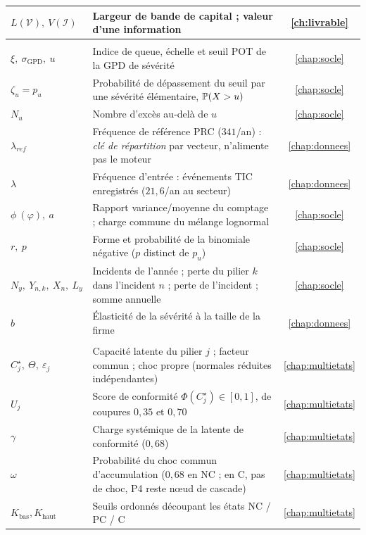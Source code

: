 {\begin{longtable}{>{\raggedright}p{3.3cm} >{\raggedright\arraybackslash}p{10.2cm} c}
$L(\mathcal{V}),\ V(\mathcal{I})$ & Largeur de bande de capital ; valeur d'une information & \ref{ch:livrable} \\
\midrule
\multicolumn{3}{@{}l}{\emph{\textcolor{navy}{Socle : fréquence et sévérité}}} \\
$\xi,\ \sigma_{\text{GPD}},\ u$ & Indice de queue, échelle et seuil POT de la GPD de sévérité & \ref{chap:socle} \\
$\zeta_u=p_u$ & Probabilité de dépassement du seuil par une sévérité élémentaire, $\mathbb{P}(X>u)$ & \ref{chap:socle} \\
$N_u$ & Nombre d'excès au-delà de $u$ & \ref{chap:socle} \\
$\lambda_{ref}$ & Fréquence de référence PRC ($341$/an) : \emph{clé de répartition} par vecteur, n'alimente pas le moteur & \ref{chap:donnees} \\
$\lambda$ & Fréquence d'entrée : événements TIC enregistrés ($21{,}6$/an au secteur) & \ref{chap:donnees} \\
$\phi\ (\varphi),\ a$ & Rapport variance/moyenne du comptage ; charge commune du mélange lognormal & \ref{chap:socle} \\
$r,\ p$ & Forme et probabilité de la binomiale négative ($p$ distinct de $p_u$) & \ref{chap:socle} \\
$N_y,\ Y_{n,k},\ X_n,\ L_y$ & Incidents de l'année ; perte du pilier $k$ dans l'incident $n$ ; perte de l'incident ; somme annuelle & \ref{chap:socle} \\
$b$ & Élasticité de la sévérité à la taille de la firme & \ref{chap:donnees} \\
\midrule
\multicolumn{3}{@{}l}{\emph{\textcolor{navy}{Conformité multi-états}}} \\
$C^\star_j,\ \Theta,\ \varepsilon_j$ & Capacité latente du pilier $j$ ; facteur commun ; choc propre (normales réduites indépendantes) & \ref{chap:multietats} \\
$U_j$ & Score de conformité $\Phi(C^\star_j)\in[0,1]$, de coupures $0{,}35$ et $0{,}70$ & \ref{chap:multietats} \\
$\gamma$ & Charge systémique de la latente de conformité ($0{,}68$) & \ref{chap:multietats} \\
$\omega$ & Probabilité du choc commun d'accumulation ($0{,}68$ en NC ; en C, pas de choc, P4 reste n\oe{}ud de cascade) & \ref{chap:multietats} \\
$K_{\text{bas}},K_{\text{haut}}$ & Seuils ordonnés découpant les états NC / PC / C & \ref{chap:multietats} \\

\end{longtable}}
